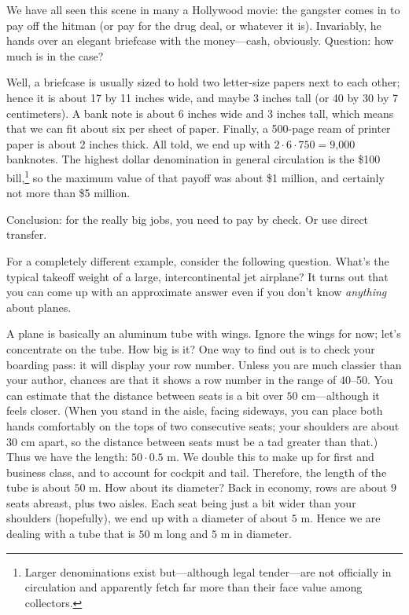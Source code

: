 We have all seen this scene in many a Hollywood movie: the gangster
comes in to pay off the hitman (or pay for the drug deal, or whatever
it is). Invariably, he hands over an elegant briefcase with the
money---cash, obviously. Question: how much is in the case?

Well, a briefcase is usually sized to hold two letter-size papers next
to each other; hence it is about 17 by 11 inches wide, and maybe 3
inches tall (or 40 by 30 by 7 centimeters). A bank note is about 6
inches wide and 3 inches tall, which means that we can fit about six
per sheet of paper. Finally, a 500-page ream of printer paper is about
2 inches thick.  All told, we end up with $2 \cdot 6 \cdot 750 =
\text{9,000}$ banknotes.  The highest dollar denomination in general
circulation is the \$100 bill,\footnote{Larger denominations exist
  but---although legal tender---are not officially in circulation and
  apparently fetch far more than their face value among collectors.} 
so the maximum value of that payoff was about \$1 million, and
certainly not more than \$5 million.

Conclusion: for the really big jobs, you need to pay by check. Or use
direct transfer.

For a completely different example, consider the following question.
What's the typical takeoff weight of a large, intercontinental jet
airplane? It turns out that you can come up with an approximate answer 
even if you don't know \emph{anything} about planes. 

A plane is basically an aluminum tube with wings. Ignore the wings for
now; let's concentrate on the tube. How big is it? One way to find out
is to check your boarding pass: it will display your row number.
Unless you are much classier than your author, chances are that it
shows a row number in the range of 40--50. You can estimate that the
distance between seats is a bit over $50 \text{ cm}$---although it
feels closer. (When you stand in the aisle, facing sideways, you can
place both hands comfortably on the tops of two consecutive seats;
your shoulders are about $30$ cm apart, so the distance between seats
must be a tad greater than that.) Thus we have the length: $50 \cdot
0.5\text{ m}$. We double this to make up for first and business class,
and to account for cockpit and tail.  Therefore, the length of the
tube is about $50 \text{ m}$. How about its diameter? Back in economy,
rows are about $9$ seats abreast, plus two  aisles. Each seat being
just a bit wider than your shoulders (hopefully), we end up with a
diameter of about $5 \text{ m}$.  Hence we are dealing with a tube
that is $50 \text{ m}$ long and $5 \text{ m}$ in diameter.

